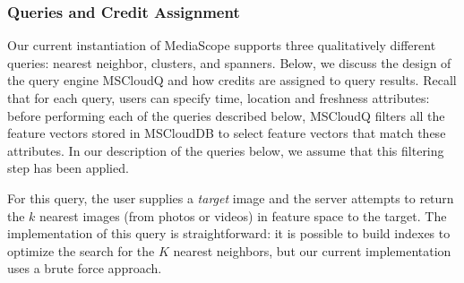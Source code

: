 
\subsubsection{Queries and Credit Assignment}
\label{sec-3-2-1}

Our current instantiation of MediaScope supports three qualitatively
different queries: nearest neighbor, clusters, and spanners.
%
Below, we discuss the design of the query engine MSCloudQ and how
credits are assigned to query results.
%
Recall that for each query, users can specify time, location and
freshness attributes: before performing each of the queries described
below, MSCloudQ filters all the feature vectors stored in MSCloudDB to
select feature vectors that match these attributes.
%
In our description of the queries below, we assume that this filtering
step has been applied.



%
For this query, the user supplies a \emph{target} image and the server
attempts to return the $k$ nearest images (from photos or videos) in
feature space to the target.
%
The implementation of this query is straightforward: it is possible to
build indexes to optimize the search for the $K$ nearest neighbors,
but our current implementation uses a brute force approach.


